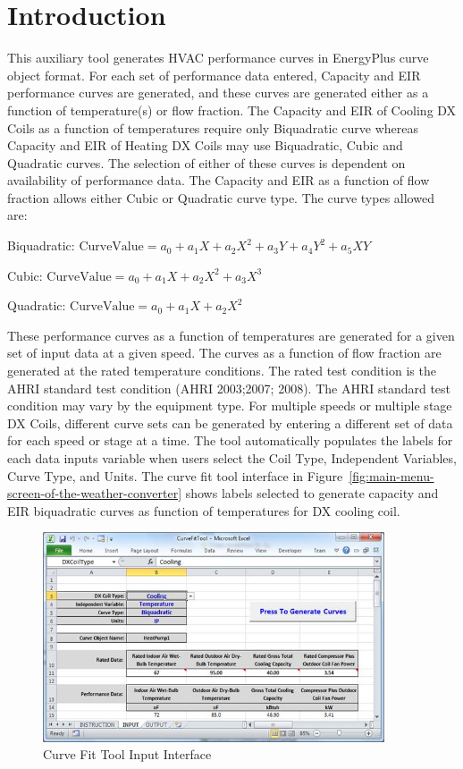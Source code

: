 \section{Introduction}\label{introduction-002}

This auxiliary tool generates HVAC performance curves in EnergyPlus curve object format. For each set of performance data entered, Capacity and EIR performance curves are generated, and these curves are generated either as a function of temperature(s) or flow fraction. The Capacity and EIR of Cooling DX Coils as a function of temperatures require only Biquadratic curve whereas Capacity and EIR of Heating DX Coils may use Biquadratic, Cubic and Quadratic curves. The selection of either of these curves is dependent on availability of performance data. The Capacity and EIR as a function of flow fraction allows either Cubic or Quadratic curve type. The curve types allowed are:

Biquadratic: \(\text{CurveValue} = a_0 + a_1 X + a_2 X^2 + a_3 Y + a_4 Y^2 + a_5 XY\)

Cubic: \(\text{CurveValue} = a_0 + a_1 X + a_2 X^2 + a_3 X^3\)

Quadratic: \(\text{CurveValue} = a_0 + a_1 X + a_2 X^2\)

These performance curves as a function of temperatures are generated for a given set of input data at a given speed. The curves as a function of flow fraction are generated at the rated temperature conditions. The rated test condition is the AHRI standard test condition (AHRI 2003;2007; 2008). The AHRI standard test condition may vary by the equipment type. For multiple speeds or multiple stage DX Coils, different curve sets can be generated by entering a different set of data for each speed or stage at a time. The tool automatically populates the labels for each data inputs variable when users select the Coil Type, Independent Variables, Curve Type, and Units. The curve fit tool interface in Figure~\ref{fig:main-menu-screen-of-the-weather-converter} shows labels selected to generate capacity and EIR biquadratic curves as function of temperatures for DX cooling coil.

\begin{figure}[hbtp] %
\centering
\includegraphics[width=0.9\textwidth, height=0.9\textheight, keepaspectratio=true]{media/image034.jpg}
\caption{Curve Fit Tool Input Interface \protect \label{fig:curve-fit-tool-input-interface}}
\end{figure}

